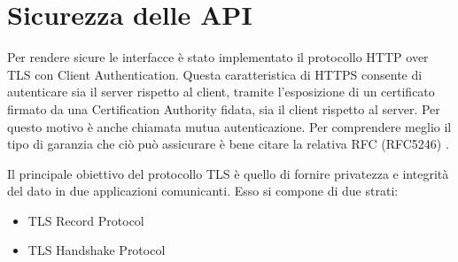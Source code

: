 \documentclass[../main.tex]{subfiles}
\begin{document}
\section{Sicurezza delle API}
Per rendere sicure le interfacce è stato implementato il protocollo HTTP over TLS con Client Authentication.
Questa caratteristica di HTTPS consente di autenticare sia il server rispetto al client, tramite l'esposizione di un certificato firmato da una Certification Authority fidata, sia il client rispetto al server. Per questo motivo è anche chiamata mutua autenticazione.\newline
Per comprendere meglio il tipo di garanzia che ciò può assicurare è bene citare la relativa RFC (RFC5246) \cite{RFC5246}.

Il principale obiettivo del protocollo TLS è quello di fornire privatezza e integrità del dato in due applicazioni comunicanti.
Esso si compone di due strati:
\begin{itemize}
\item TLS Record Protocol
\item TLS Handshake Protocol
\end{itemize}
\end{document}
